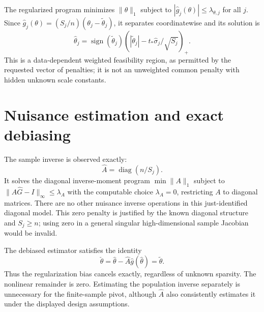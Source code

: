 \documentclass[11pt]{article}
\begin{document}
The regularized program minimizes $\|\theta\|_1$ subject to
$|\widehat g_j(\theta)|\leq\lambda_{\theta,j}$ for all $j$.
Since $\widehat g_j(\theta)=(S_j/n)(\theta_j-\widetilde\theta_j)$, it separates coordinatewise and its solution is
\[
 \widehat\theta_j=\operatorname{sign}(\widetilde\theta_j)
        (|\widetilde\theta_j|-t_*\widehat\sigma_j/\sqrt{S_j})_+.
\]
This is a data-dependent weighted feasibility region, as permitted by the requested vector of penalties; it is not an unweighted common penalty with hidden unknown scale constants.

\section*{Nuisance estimation and exact debiasing}
The sample inverse is observed exactly:
\[
                      \widehat A=\operatorname{diag}(n/S_j).
\]
It solves the diagonal inverse-moment program
$\min\|A\|_1$ subject to $\|A\widehat G-I\|_\infty\leq\lambda_A$
with the computable choice $\lambda_A=0$, restricting $A$ to diagonal matrices. There are no other nuisance inverse operations in this just-identified diagonal model. This zero penalty is justified by the known diagonal structure and $S_j\geq n$; using zero in a general singular high-dimensional sample Jacobian would be invalid.

The debiased estimator satisfies the identity
\[
 \check\theta=\widehat\theta-\widehat A\widehat g(\widehat\theta)
              =\widetilde\theta.
\]
Thus the regularization bias cancels exactly, regardless of unknown sparsity. The nonlinear remainder is zero. Estimating the population inverse separately is unnecessary for the finite-sample pivot, although $\widehat A$ also consistently estimates it under the displayed design assumptions.
\end{document}
